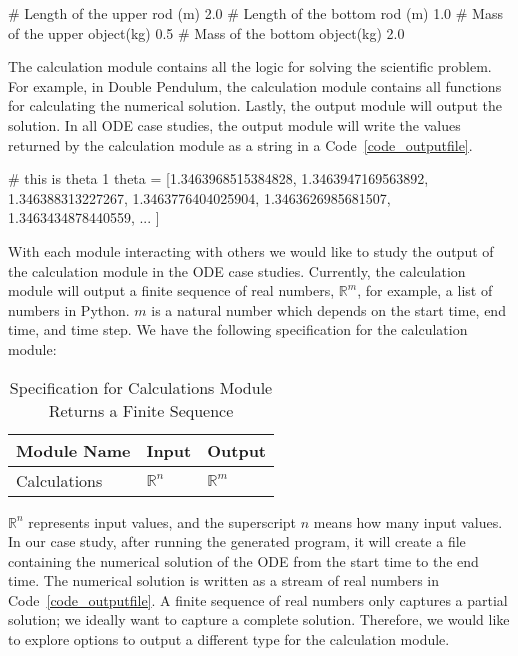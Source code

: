 \begin{listing}[ht]
\begin{python1}
# Length of the upper rod (m)
2.0
# Length of the bottom rod (m)
1.0
# Mass of the upper object(kg)
0.5
# Mass of the bottom object(kg)
2.0
\end{python1}
\label{code_inputfile}
\end{listing}

The calculation module contains all the logic for solving the scientific problem. For example, in Double Pendulum, the calculation module contains all functions for calculating the numerical solution. Lastly, the output module will output the solution. In all ODE case studies, the output module will write the values returned by the calculation module as a string in a Code~\ref{code_outputfile}. 

\begin{listing}[ht]
\begin{python1}
# this is theta 1
theta = [1.3463968515384828, 1.3463947169563892, 1.346388313227267, 1.3463776404025904, 1.3463626985681507, 1.3463434878440559, ... ]
\end{python1}
\label{code_outputfile}
\end{listing}

With each module interacting with others we would like to study the output of the calculation module in the ODE case studies. Currently, the calculation module will output a finite sequence of real numbers, $\mathbb{R}^m$, for example, a list of numbers in Python. $m$ is a natural number which depends on the start time, end time, and time step. We have the following specification for the calculation module:

\begin{table}[ht]
\centering
\begin{tabular}{p{} | p{} | p{}} \hline
    \textbf{Module Name}&\textbf{Input}&\textbf{Output}\\
    \toprule
    Calculations & $\mathbb{R}^n$ & $\mathbb{R}^m$ \\
    \bottomrule	
\end{tabular}	
\caption{Specification for Calculations Module Returns a Finite Sequence}	
\label{tab_srsforcal}
\end{table}
$\mathbb{R}^n$ represents input values, and the superscript $n$ means how many input values. In our case study, after running the generated program, it will create a file containing the numerical solution of the ODE from the start time to the end time. The numerical solution is written as a stream of real numbers in Code~\ref{code_outputfile}. A finite sequence of real numbers only captures a partial solution; we ideally want to capture a complete solution. Therefore, we would like to explore options to output a different type for the calculation module.

